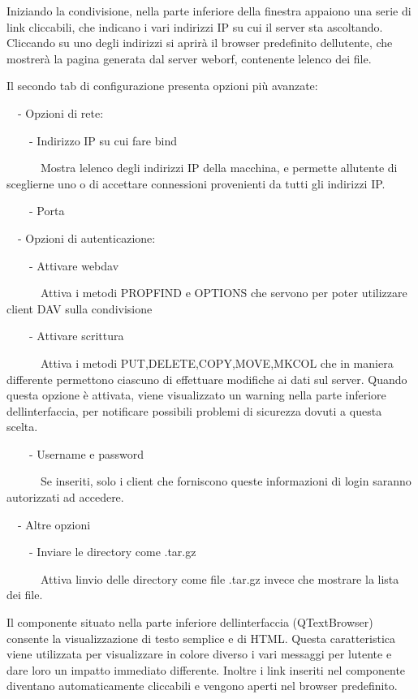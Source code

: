 \documentclass[a4paper,11pt]{article}
\begin{document}
\bigskip

{\sffamily
Iniziando la condivisione, nella parte inferiore della finestra appaiono
una serie di link cliccabili, che indicano i vari indirizzi IP su cui
il server sta ascoltando. Cliccando su uno degli indirizzi si aprir\`a
il browser predefinito dell{\textquotesingle}utente, che mostrer\`a la
pagina generata dal server weborf, contenente l{\textquotesingle}elenco
dei file.}

{\sffamily
Il secondo tab di configurazione presenta opzioni pi\`u avanzate:}

{\sffamily
\ \ {}- Opzioni di rete:}

{\sffamily
\ \ \ \ {}- Indirizzo IP su cui fare bind}

{\sffamily
\ \ \ \ \ \ Mostra l{\textquotesingle}elenco degli indirizzi IP della
macchina, e permette all{\textquotesingle}utente di sceglierne uno o di
accettare connessioni provenienti da tutti gli indirizzi IP.}

{\sffamily
\ \ \ \ {}- Porta}

{\sffamily
\ \ {}- Opzioni di autenticazione:}

{\sffamily
\ \ \ \ {}- Attivare webdav}

{\sffamily
\ \ \ \ \ \ Attiva i metodi PROPFIND e OPTIONS che servono per poter
utilizzare client DAV sulla condivisione}

{\sffamily
\ \ \ \ {}- Attivare scrittura}

{\sffamily
\ \ \ \ \ \ Attiva i metodi PUT,DELETE,COPY,MOVE,MKCOL che in maniera
differente permettono ciascuno di effettuare modifiche ai dati sul
server. Quando questa opzione \`e attivata, viene visualizzato un
warning nella parte inferiore dell{\textquotesingle}interfaccia, per
notificare possibili problemi di sicurezza dovuti a questa scelta.}

{\sffamily
\ \ \ \ {}- Username e password}

{\sffamily
\ \ \ \ \ \ Se inseriti, solo i client che forniscono queste
informazioni di login saranno autorizzati ad accedere.}

{\sffamily
\ \ {}- Altre opzioni}

{\sffamily
\ \ \ \ {}- Inviare le directory come .tar.gz}

{\sffamily
\ \ \ \ \ \ Attiva l{\textquotesingle}invio delle directory come file
.tar.gz invece che mostrare la lista dei file.}


\bigskip

{\sffamily
Il componente situato nella parte inferiore
dell{\textquotesingle}interfaccia (QTextBrowser) consente la
visualizzazione di testo semplice e di HTML. Questa caratteristica
viene utilizzata per visualizzare in colore diverso i vari messaggi per
l{\textquotesingle}utente e dare loro un impatto immediato differente.
Inoltre i link inseriti nel componente diventano automaticamente
cliccabili e vengono aperti nel browser predefinito.}
\end{document}
